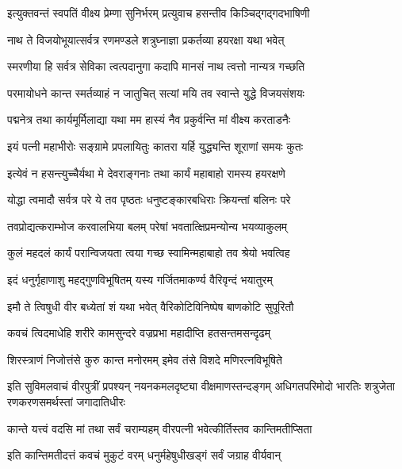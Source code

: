 \resetShloka


\twolineshloka
{इत्युक्तवन्तं स्वपतिं वीक्ष्य प्रेम्णा सुनिर्भरम्}
{प्रत्युवाच हसन्तीव किञ्चिद्गद्गदभाषिणी}%

\twolineshloka
{नाथ ते विजयोभूयात्सर्वत्र रणमण्डले}
{शत्रुघ्नाज्ञा प्रकर्तव्या हयरक्षा यथा भवेत्}%

\twolineshloka
{स्मरणीया हि सर्वत्र सेविका त्वत्पदानुगा}
{कदापि मानसं नाथ त्वत्तो नान्यत्र गच्छति}%

\twolineshloka
{परमायोधने कान्त स्मर्तव्याहं न जातुचित्}
{सत्यां मयि तव स्वान्ते युद्धे विजयसंशयः}%

\twolineshloka
{पद्मनेत्र तथा कार्यमूर्मिलाद्या यथा मम}
{हास्यं नैव प्रकुर्वन्ति मां वीक्ष्य करताडनैः}%

\twolineshloka
{इयं पत्नी महाभीरोः सङ्ग्रामे प्रपलायितुः}
{कातरा यर्हि युद्ध्यन्ति शूराणां समयः कुतः}%

\twolineshloka
{इत्येवं न हसन्त्युच्चैर्यथा मे देवराङ्गनाः}
{तथा कार्यं महाबाहो रामस्य हयरक्षणे}%

\twolineshloka
{योद्धा त्वमादौ सर्वत्र परे ये तव पृष्ठतः}
{धनुष्टङ्कारबधिराः क्रियन्तां बलिनः परे}%

\twolineshloka
{तवप्रोद्यत्कराम्भोज करवालभिया बलम्}
{परेषां भवतात्क्षिप्रमन्योन्य भयव्याकुलम्}%

\twolineshloka
{कुलं महदलं कार्यं परान्विजयता त्वया}
{गच्छ स्वामिन्महाबाहो तव श्रेयो भवत्विह}%

\twolineshloka
{इदं धनुर्गृहाणाशु महद्गुणविभूषितम्}
{यस्य गर्जितमाकर्ण्य वैरिवृन्दं भयातुरम्}%

\twolineshloka
{इमौ ते त्विषुधी वीर बध्येतां शं यथा भवेत्}
{वैरिकोटिविनिष्पेष बाणकोटि सुपूरितौ}%

\twolineshloka
{कवचं त्विदमाधेहि शरीरे कामसुन्दरे}
{वज्रप्रभा महादीप्ति हतसन्तमसन्दृढम्}%

\twolineshloka
{शिरस्त्राणं निजोत्तंसे कुरु कान्त मनोरमम्}
{इमेव तंसे विशदे मणिरत्नविभूषिते}%

\fourlineindentedshloka
{इति सुविमलवाचं वीरपुत्रीं प्रपश्यन्}
{नयनकमलदृष्ट्या वीक्षमाणस्तन्दङ्गम्}
{अधिगतपरिमोदो भारतिः शत्रुजेता}
{रणकरणसमर्थस्तां जगादातिधीरः}%


\twolineshloka
{कान्ते यत्त्वं वदसि मां तथा सर्वं चराम्यहम्}
{वीरपत्नी भवेत्कीर्तिस्तव कान्तिमतीप्सिता}%

\twolineshloka
{इति कान्तिमतीदत्तं कवचं मुकुटं वरम्}
{धनुर्महेषुधीखड्गं सर्वं जग्राह वीर्यवान्}%

